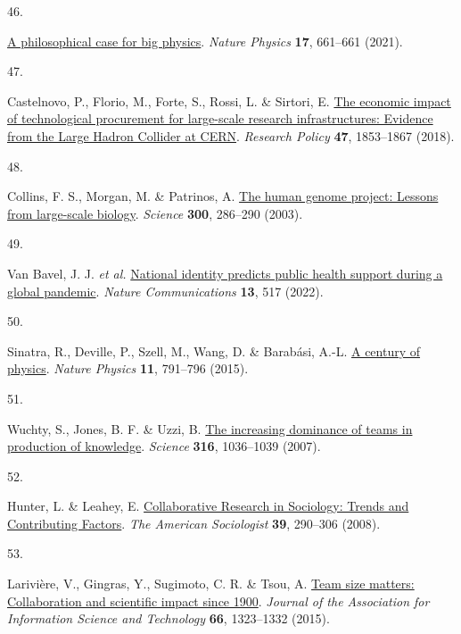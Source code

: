 \documentclass[
  man,floatsintext]{apa6}
\newlength{\cslhangindent}
\newlength{\csllabelwidth}
\newlength{\cslentryspacingunit} %
\newenvironment{CSLReferences}[2] %
 {%
  \setlength{\parindent}{0pt}
  \ifodd #1
  \let\oldpar\par
  \def\par{\hangindent=\cslhangindent\oldpar}
  \fi
  \setlength{\parskip}{#2\cslentryspacingunit}
 }%
 {}
\newcommand{\CSLLeftMargin}[1]{\parbox[t]{\csllabelwidth}{#1}}
\newcommand{\CSLRightInline}[1]{\parbox[t]{\linewidth - \csllabelwidth}{#1}\break}
\begin{document}
\begin{CSLReferences}{0}{0}
\leavevmode{}%
\CSLLeftMargin{46. }%
\CSLRightInline{\href{https://doi.org/10.1038/s41567-021-01278-0}{A philosophical case for big physics}. \emph{Nature Physics} \textbf{17}, 661--661 (2021).}

\leavevmode{}%
\CSLLeftMargin{47. }%
\CSLRightInline{Castelnovo, P., Florio, M., Forte, S., Rossi, L. \& Sirtori, E. \href{https://doi.org/10.1016/j.respol.2018.06.018}{The economic impact of technological procurement for large-scale research infrastructures: Evidence from the Large Hadron Collider at CERN}. \emph{Research Policy} \textbf{47}, 1853--1867 (2018).}

\leavevmode{}%
\CSLLeftMargin{48. }%
\CSLRightInline{Collins, F. S., Morgan, M. \& Patrinos, A. \href{https://doi.org/10.1126/science.1084564}{The human genome project: Lessons from large-scale biology}. \emph{Science} \textbf{300}, 286--290 (2003).}

\leavevmode{}%
\CSLLeftMargin{49. }%
\CSLRightInline{Van Bavel, J. J. \emph{et al.} \href{https://doi.org/10.1038/s41467-021-27668-9}{National identity predicts public health support during a global pandemic}. \emph{Nature Communications} \textbf{13}, 517 (2022).}

\leavevmode{}%
\CSLLeftMargin{50. }%
\CSLRightInline{Sinatra, R., Deville, P., Szell, M., Wang, D. \& Barabási, A.-L. \href{https://doi.org/10.1038/nphys3494}{A century of physics}. \emph{Nature Physics} \textbf{11}, 791--796 (2015).}

\leavevmode{}%
\CSLLeftMargin{51. }%
\CSLRightInline{Wuchty, S., Jones, B. F. \& Uzzi, B. \href{https://doi.org/10.1126/science.1136099}{The increasing dominance of teams in production of knowledge}. \emph{Science} \textbf{316}, 1036--1039 (2007).}

\leavevmode{}%
\CSLLeftMargin{52. }%
\CSLRightInline{Hunter, L. \& Leahey, E. \href{https://doi.org/10.1007/s12108-008-9042-1}{Collaborative Research in Sociology: Trends and Contributing Factors}. \emph{The American Sociologist} \textbf{39}, 290--306 (2008).}

\leavevmode{}%
\CSLLeftMargin{53. }%
\CSLRightInline{Larivière, V., Gingras, Y., Sugimoto, C. R. \& Tsou, A. \href{https://doi.org/10.1002/asi.23266}{Team size matters: Collaboration and scientific impact since 1900}. \emph{Journal of the Association for Information Science and Technology} \textbf{66}, 1323--1332 (2015).}


\end{CSLReferences}
\end{document}
